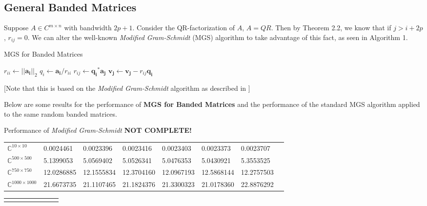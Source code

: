 \documentclass{article}
\numberwithin{pic}{section}
\numberwithin{lem}{section}
\numberwithin{thm}{section}
\numberwithin{cor}{section}
\theoremstyle{definition}
\numberwithin{ex}{section}
\numberwithin{defn}{section}
\theoremstyle{definition}
\theoremstyle{remark}
\newcommand{\set}[1]{\ensuremath{\left\{ #1\right\}}} %
\newcommand{\C}{\ensuremath{\mathbb{C}}} %
\newcommand{\norm}[1]{\ensuremath{\left | \left | #1 \right | \right |}}
\newlength\tindent
\renewcommand{\indent}{\hspace*{\tindent}}
\begin{document}
\subsection{General Banded Matrices}
\indent Suppose $A\in C^{m\times n}$ with bandwidth $2p +1$. Consider the QR-factorization
of $A$, $A = QR$. Then by Theorem 2.2, we
know that if $j > i + 2p$, $r_{ij} = 0$. We can alter the well-known
\textit{Modified Gram-Schmidt} (MGS) algorithm to take advantage of this fact, as seen in
Algorithm 1.
\begin{algorithm}
  \caption{MGS for Banded Matrices}
  \begin{algorithmic}[1]
    \State$r_{ii}\gets \norm{\mathbf{a_i}}_2$
    \State$q_i\gets \mathbf{a_i} / r_{ii}$
    \For{$j = i + 1$\textbf{ to }$\text{min}\set{i + 2p, n}$}
    \State$r_{ij}\gets \mathbf{q_i}^*\mathbf{a_j}$
    \State$\mathbf{v_j}\gets\mathbf{v_j} - r_{ij}\mathbf{q_i}$
    \EndFor
    \EndFor
  \end{algorithmic}
  [Note that this is based on the \textit{Modified
    Gram-Schmidt} algorithm as described in \cite{nla}] 
\end{algorithm}
\indent Below are some results for the performance of \textbf{MGS for Banded Matrices}
and the performance of the standard MGS algorithm applied to the same random
banded matrices.
\begin{center}
 Performance of \textit{Modified Gram-Schmidt} \textbf{NOT COMPLETE!}
\begin{tabular}{p{2cm}|p{2cm}p{2cm}p{2cm}p{2cm}p{2cm}p{2cm}p{2cm}}
    $\C^{10\times 10}$ & 0.0024461 &   0.0023396 &   0.0023416 &   0.0023403  &  0.0023373  &  0.0023707\\
    $\C^{500\times 500}$& 5.1399053  &  5.0569402   & 5.0526341  &  5.0476353 &   5.0430921  &  5.3553525\\
   $\C^{750\times 750}$& 12.0286885  & 12.1555834  & 12.3704160  & 12.0967193 &  12.5868144  & 12.2757503\\
  $\C^{1000\times 1000}$& 21.6673735  & 21.1107465  & 21.1824376  & 21.3300323  & 21.0178360  & 22.8876292 
\end{tabular}
\end{center}
\begin{center}
  \begin{tabular}{p{1cm}|p{2cm}p{2cm}p{2cm}p{2cm}p{2cm}p{2cm}p{2cm}}
    & & & & & &
  \end{tabular}
\end{center}
\end{document}
